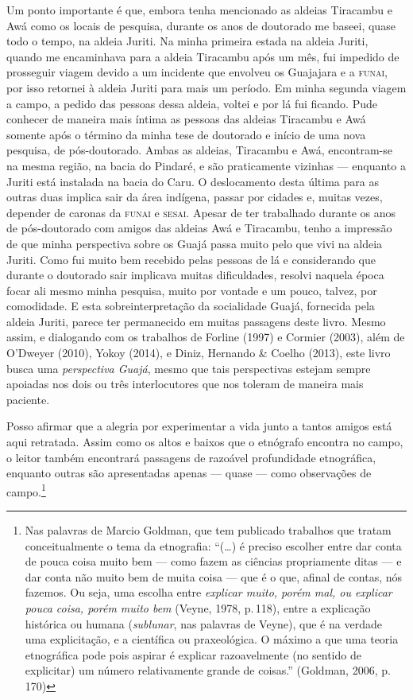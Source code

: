 Um ponto importante é que, embora tenha mencionado as aldeias
Tiracambu e Awá como os locais de pesquisa, durante os anos de doutorado
me baseei, quase todo o tempo, na aldeia Juriti. Na minha primeira
estada na aldeia Juriti, quando me encaminhava
para a aldeia Tiracambu após um mês, fui impedido de prosseguir viagem devido a um
incidente que envolveu os Guajajara e a \textsc{funai}, por isso retornei à
aldeia Juriti para mais um período. Em minha segunda viagem a campo, a
pedido das pessoas dessa aldeia, voltei e por lá fui ficando.
Pude conhecer de maneira mais íntima as pessoas das aldeias Tiracambu e Awá somente
após o término da minha tese de doutorado e início de uma nova pesquisa,
de pós-doutorado. Ambas as aldeias, Tiracambu e Awá, encontram-se na
mesma região, na bacia do Pindaré, e são praticamente vizinhas --- enquanto
a Juriti está instalada na bacia do Caru. O deslocamento desta última
para as outras duas implica sair da área indígena, passar por cidades e,
muitas vezes, depender de caronas da \textsc{funai} e \textsc{sesai}. Apesar de ter
trabalhado durante os anos de pós-doutorado com amigos das aldeias Awá
e Tiracambu, tenho a impressão de que minha perspectiva sobre os Guajá
passa muito pelo que vivi na aldeia Juriti. Como fui muito bem recebido
pelas pessoas de lá e considerando que durante o doutorado sair
implicava muitas dificuldades, resolvi naquela época focar ali mesmo
minha pesquisa, muito por vontade e um pouco, talvez, por comodidade. E
esta sobreinterpretação da socialidade Guajá, fornecida pela aldeia
Juriti, parece ter permanecido em muitas passagens deste livro. Mesmo
assim, e dialogando com os trabalhos de Forline (1997) e Cormier (2003),
além de O'Dweyer (2010), Yokoy (2014), e Diniz, Hernando \& Coelho
(2013), este livro busca uma \textit{perspectiva Guajá}, mesmo que tais
perspectivas estejam sempre apoiadas nos dois ou três interlocutores que
nos toleram de maneira mais paciente.

Posso afirmar que a alegria por experimentar a vida junto a tantos
amigos está aqui retratada. Assim como os altos e baixos que o etnógrafo
encontra no campo, o leitor também encontrará passagens de razoável
profundidade etnográfica, enquanto outras são apresentadas apenas ---
quase --- como observações de campo.\footnote{Nas palavras de Marcio
  Goldman, que tem publicado trabalhos que tratam conceitualmente o tema
  da etnografia: ``(\ldots{}) é preciso escolher entre dar conta de pouca
  coisa muito bem --- como fazem as ciências propriamente ditas --- e dar
  conta não muito bem de muita coisa --- que é o que, afinal de contas,
  nós fazemos. Ou seja, uma escolha entre \textit{explicar muito, porém mal,
  ou explicar pouca coisa, porém muito bem} (Veyne, 1978, p.\,118), entre a
  explicação histórica ou humana (\textit{sublunar}, nas palavras de Veyne),
  que é na verdade uma explicitação, e a científica ou praxeológica. O
  máximo a que uma teoria etnográfica pode pois aspirar é explicar
  razoavelmente (no sentido de explicitar) um número relativamente
  grande de coisas.'' (Goldman, 2006, p.\,170)} %

